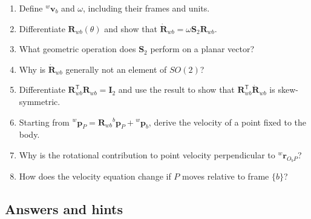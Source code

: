 \documentclass[
  australian,
  12pt,
  letterpaper,
  DIV=11,
  numbers=noendperiod,
  twoside]{scrreprt}
\providecommand{\tightlist}{%
  \setlength{\itemsep}{0pt}\setlength{\parskip}{0pt}}
\begin{document}
\begin{enumerate}
\def\labelenumi{\arabic{enumi}.}
\tightlist
\item
  Define \({}^{w}\mathbf v_b\) and \(\omega\), including their frames
  and units.
\item
  Differentiate \(\mathbf R_{wb}(\theta)\) and show that
  \(\dot{\mathbf R}_{wb}=\omega\mathbf S_2\mathbf R_{wb}\).
\item
  What geometric operation does \(\mathbf S_2\) perform on a planar
  vector?
\item
  Why is \(\dot{\mathbf R}_{wb}\) generally not an element of \(SO(2)\)?
\item
  Differentiate \(\mathbf R_{wb}^\mathsf T\mathbf R_{wb}=\mathbf I_2\)
  and use the result to show that
  \(\mathbf R_{wb}^\mathsf T\dot{\mathbf R}_{wb}\) is skew-symmetric.
\item
  Starting from
  \({}^{w}\mathbf p_P=\mathbf R_{wb}{}^{b}\mathbf p_P+{}^{w}\mathbf p_b\),
  derive the velocity of a point fixed to the body.
\item
  Why is the rotational contribution to point velocity perpendicular to
  \({}^{w}\mathbf r_{O_bP}\)?
\item
  How does the velocity equation change if \(P\) moves relative to frame
  \(\{b\}\)?
\end{enumerate}

\subsection*{Answers and hints}\label{answers-and-hints-12}
\end{document}
